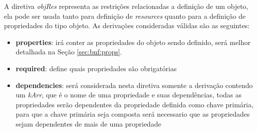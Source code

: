 \label{sec:bnf:obj}
A diretiva \textit{objRes} representa as restrições relacionadas a definição de um objeto, ela pode ser usada tanto para definição de \textit{resources} quanto para a definição de propriedades do tipo objeto. As derivações consideradas válidas são as seguintes:

\begin{itemize}
    \item \textbf{properties}: irá conter as propriedades do objeto sendo definido, será melhor detalhada na Seção \ref{sec:bnf:props}.


    \item \textbf{required}: define quais propriedades são obrigatórias

    \item \textbf{dependencies}: será considerada nesta diretiva somente a derivação contendo um \textit{kArr}, que é o nome de uma propriedade e suas dependências, todas as propriedades serão dependentes da propriedade definida como chave primária, para que a chave primária seja composta será necessario que as propriedades sejam dependentes de mais de uma propriedade
\end{itemize}

